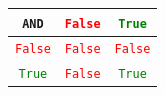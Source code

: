 \documentclass[border=10pt]{standalone}
\newcommand{\firatt}[1]{\texttt{#1}}
\newcommand{\firatrue}{\textcolor{green}{\firatt{True}}}
\newcommand{\firafalse}{\textcolor{red}{\firatt{False}}}
\begin{document}
\begin{tabular}{c|cc}
\firatt{AND} & \firafalse & \firatrue \\
\hline
\firafalse & \firafalse & \firafalse \\
\firatrue & \firafalse & \firatrue \\
\end{tabular}
\end{document}
